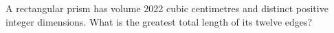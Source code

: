 A rectangular prism has volume 2022 cubic centimetres and distinct positive integer dimensions. What is the greatest total length of its twelve edges?
